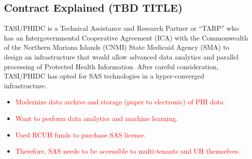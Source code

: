 \subsection{Contract Explained (TBD TITLE)}
TASI/PHIDC is a Technical Assistance and Research Partner or “TARP” who has an Intergovernmental Cooperative Agreement (ICA) with the Commonwealth of the Northern Mariana Islands (CNMI) State Medicaid Agency (SMA) to design an infrastructure that would allow advanced data analytics and parallel processing of Protected Health Information. After careful consideration, TASI/PHIDC has opted for SAS technologies in a hyper-converged infrastructure.

\begin{itemize}
    \item \textcolor{red}{Modernize data archive and storage (paper to electronic) of PHI data.}
    \item \textcolor{red}{Want to perform data analytics and machine learning.}
    \item \textcolor{red}{Used RCUH funds to purchase SAS license.}
    \item \textcolor{red}{Therefore, SAS needs to be accessible to multi-tenants and UH themselves.}
\end{itemize}